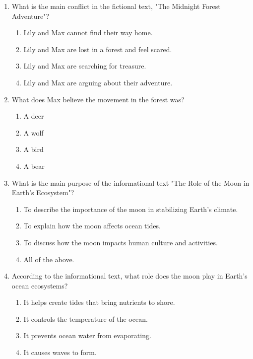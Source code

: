 \documentclass[12pt]{article}
\begin{document}
\begin{enumerate}

\item What is the main conflict in the fictional text, "The Midnight Forest Adventure"?
\begin{enumerate}[label=\Alph*.]
    \item Lily and Max cannot find their way home.
    \item Lily and Max are lost in a forest and feel scared.
    \item Lily and Max are searching for treasure.
    \item Lily and Max are arguing about their adventure.
\end{enumerate}

\vspace{0.5cm}

\item What does Max believe the movement in the forest was?
\begin{enumerate}[label=\Alph*.]
    \item A deer
    \item A wolf
    \item A bird
    \item A bear
\end{enumerate}

\vspace{0.5cm}

\item What is the main purpose of the informational text "The Role of the Moon in Earth's Ecosystem"?
\begin{enumerate}[label=\Alph*.]
    \item To describe the importance of the moon in stabilizing Earth’s climate.
    \item To explain how the moon affects ocean tides.
    \item To discuss how the moon impacts human culture and activities.
    \item All of the above.
\end{enumerate}

\vspace{0.5cm}

\item According to the informational text, what role does the moon play in Earth’s ocean ecosystems?
\begin{enumerate}[label=\Alph*.]
    \item It helps create tides that bring nutrients to shore.
    \item It controls the temperature of the ocean.
    \item It prevents ocean water from evaporating.
    \item It causes waves to form.
\end{enumerate}


\end{enumerate}
\end{document}
